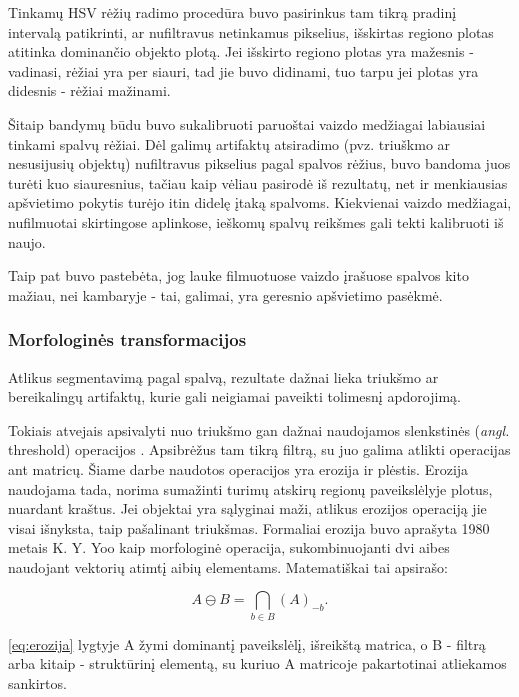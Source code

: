 \documentclass{VUMIFPSbakalaurinis}
\begin{document}
Tinkamų HSV rėžių radimo procedūra buvo pasirinkus tam tikrą pradinį intervalą patikrinti, ar nufiltravus netinkamus pikselius, išskirtas regiono plotas atitinka dominančio objekto plotą. Jei išskirto regiono plotas yra mažesnis - vadinasi, rėžiai yra per siauri, tad jie buvo didinami, tuo tarpu jei plotas yra didesnis - rėžiai mažinami. 

Šitaip bandymų būdu buvo sukalibruoti paruoštai vaizdo medžiagai labiausiai tinkami spalvų rėžiai. Dėl galimų artifaktų atsiradimo (pvz. triuškmo ar nesusijusių objektų) nufiltravus pikselius pagal spalvos rėžius, buvo bandoma juos turėti kuo siauresnius, tačiau kaip vėliau pasirodė iš rezultatų, net ir menkiausias apšvietimo pokytis turėjo itin didelę įtaką spalvoms. Kiekvienai vaizdo medžiagai, nufilmuotai skirtingose aplinkose, ieškomų spalvų reikšmes gali tekti kalibruoti iš naujo.

Taip pat buvo pastebėta, jog lauke filmuotuose vaizdo įrašuose spalvos kito mažiau, nei kambaryje - tai, galimai, yra geresnio apšvietimo pasėkmė. 

\subsubsection{Morfologinės transformacijos}
Atlikus segmentavimą pagal spalvą, rezultate dažnai lieka triukšmo ar bereikalingų artifaktų, kurie gali neigiamai paveikti tolimesnį apdorojimą.

Tokiais atvejais apsivalyti nuo triukšmo gan dažnai naudojamos slenkstinės (\textit{angl.} threshold) operacijos \cite[112]{SzeliskiCompVision}. Apsibrėžus tam tikrą filtrą, su juo galima atlikti operacijas ant matricų. Šiame darbe naudotos operacijos yra erozija ir plėstis. Erozija naudojama tada, norima sumažinti turimų atskirų regionų paveikslėlyje plotus, nuardant kraštus. Jei objektai yra sąlyginai maži, atlikus erozijos operaciją jie visai išnyksta, taip pašalinant triukšmas. Formaliai erozija buvo aprašyta 1980 metais K. Y. Yoo \cite{4767941} kaip morfologinė operacija, sukombinuojanti dvi aibes naudojant vektorių atimtį aibių elementams. Matematiškai tai apsirašo: 

\begin{equation}\label{eq:erozija}
	A \ominus B = \bigcap_ {b \in B } (A)_{-b} .
\end{equation}

\ref{eq:erozija} lygtyje A žymi dominantį paveikslėlį, išreikštą matrica, o B - filtrą arba kitaip - struktūrinį elementą, su kuriuo A matricoje pakartotinai atliekamos sankirtos.  
\end{document}
